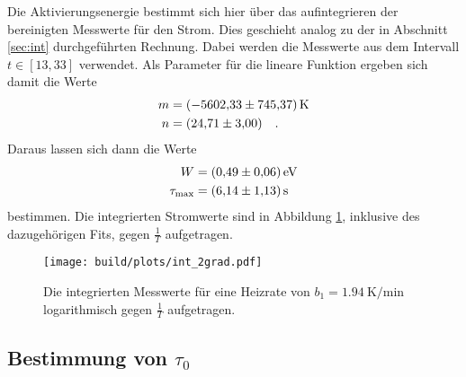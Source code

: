 \noindent
Die Aktivierungsenergie bestimmt sich hier über das aufintegrieren der bereinigten Messwerte für den Strom. 
Dies geschieht analog zu der in Abschnitt \ref{sec:int} durchgeführten Rechnung.
Dabei werden die Messwerte aus dem Intervall  $t \in [13,33]$ verwendet.
Als Parameter für die lineare Funktion ergeben sich damit die Werte
\begin{align*}
  m & = \SI{  -5602.33 (74537)}{\kelvin}\\
  n & = \SI{24.71 (300)}{} \quad .
\end{align*}
Daraus lassen sich dann die Werte 
\begin{align*}
  W &= \SI{ 0.49  (006)}{\electronvolt}\\
  \tau_\t{max} &= \SI{6.14 (113)}{\second}
\end{align*}
bestimmen. Die integrierten Stromwerte sind in Abbildung \ref{img:int2}, inklusive des dazugehörigen Fits, gegen $\frac{1}{T}$ aufgetragen.

\begin{figure}[ht]
  \centering
  \texttt{[image: build/plots/int\_2grad.pdf]}
  \caption{Die integrierten Messwerte für eine Heizrate von $b_1 = \SI{1.94}{\kelvin\per\minute}$ 
          logarithmisch gegen $\frac{1}{T}$ aufgetragen.}
  \label{img:int2}
\end{figure}


\subsection{Bestimmung von \textbf{\texorpdfstring{$\tau_0$}{tau_0}}}
\label{sec:tau}

